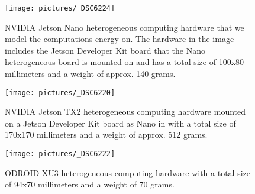 \begin{figure}[h!]
  \centering 
  \texttt{[image: pictures/\_DSC6224]}
  \caption[NVIDIA Jetson Nano heterogeneous computing hardware]{NVIDIA Jetson Nano heterogeneous computing hardware that we model the computations energy on. The hardware in the image includes the Jetson Developer Kit board that the Nano heterogeneous board is mounted on and has a total size of 100x80 millimeters and a weight of approx. 140 grams.}  
  \label{fig:nano}
\end{figure}
\begin{figure}[h!]   
  \centering 
  \texttt{[image: pictures/\_DSC6220]}
  \caption[NVIDIA Jetson TX2 heterogeneous computing hardware]{NVIDIA Jetson TX2 heterogeneous computing hardware mounted on a Jetson Developer Kit board as Nano in  with a total size of 170x170 millimeters and a weight of approx. 512 grams.}   
  \label{fig:tx2}
\end{figure}
\begin{figure}[h!]
  \centering
  \texttt{[image: pictures/\_DSC6222]}
  \caption[ODROID XU3 heterogeneous computing hardware]{ODROID XU3 heterogeneous computing hardware with a total size of 94x70 millimeters and a weight of 70 grams.}
  \label{fig:odroid}
\end{figure}

